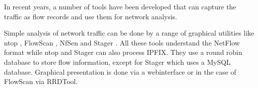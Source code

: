 
In recent years, a number of tools have been developed that can capture the
traffic as flow records and use them for network analysis.

Simple analysis of network traffic can be done by a range of graphical
utilities like ntop \cite{ntop:2000}, FlowScan \cite{flowscan:2000}, NfSen
\cite{phaag:2006} and Stager \cite{oslebo:2006}. All these tools understand the
NetFlow format while ntop and Stager can also process \ac{IPFIX}. They use a
round robin database to store flow information, except for Stager which uses a
MySQL database. Graphical presentation is done via a webinterface or in the
case of FlowScan via RRDTool.

